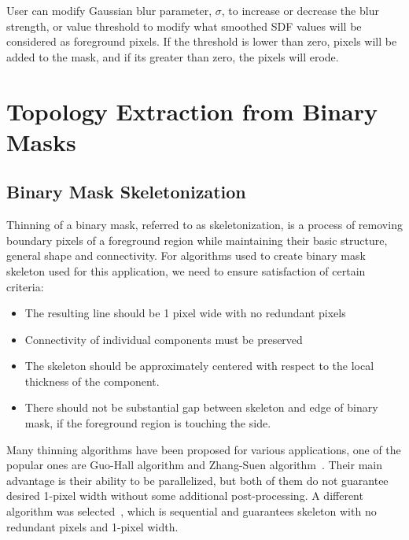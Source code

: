 
User can modify Gaussian blur parameter, $\sigma$, to increase or decrease the blur strength, or value threshold to modify what smoothed SDF values will be considered as foreground pixels. If the threshold is lower than zero, pixels will be added to the mask, and if its greater than zero, the pixels will erode.


\section{Topology Extraction from Binary Masks} %

\subsection{Binary Mask Skeletonization}

Thinning of a binary mask, referred to as skeletonization, is a process of removing boundary pixels of a foreground region while maintaining their basic structure, general shape and connectivity. For algorithms used to create binary mask skeleton used for this application, we need to ensure satisfaction of certain criteria:
\begin{itemize}
	\item The resulting line should be 1 pixel wide with no redundant pixels
	\item Connectivity of individual components must be preserved
	\item The skeleton should be approximately centered with respect to the local thickness of the component.
	\item There should not be substantial gap between skeleton and edge of binary mask, if the foreground region is touching the side.
\end{itemize}

Many thinning algorithms have been proposed for various applications, one of the popular ones are Guo-Hall algorithm and Zhang-Suen algorithm~\cite{bk_zhang_suen}. Their main advantage is their ability to be parallelized, but both of them do not guarantee desired 1-pixel width without some additional post-processing. A different algorithm was selected~\cite{bk_jain_himanshu}, which is sequential and guarantees skeleton with no redundant pixels and 1-pixel width. 

